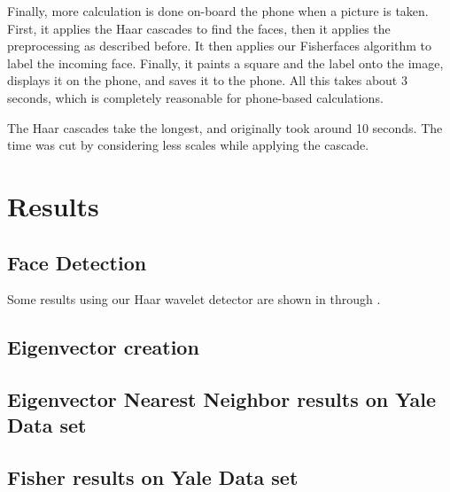 Finally, more calculation is done on-board the phone when a picture is
taken.  First, it applies the Haar cascades to find the faces, then it
applies the preprocessing as described before. It then applies our
Fisherfaces algorithm to label the incoming face.  Finally, it paints
a square and the label onto the image, displays it on the phone, and
saves it to the phone.  All this takes about 3 seconds, which is
completely reasonable for phone-based calculations.

The Haar cascades take the longest, and originally took around 10
seconds.  The time was cut by considering less scales while applying
the cascade.



\section{Results}

\subsection{Face Detection}

Some results using our Haar wavelet detector are shown in
 through .





\subsection{Eigenvector creation}


\subsection{Eigenvector Nearest Neighbor results on Yale Data set}


\subsection{Fisher results on Yale Data set}

